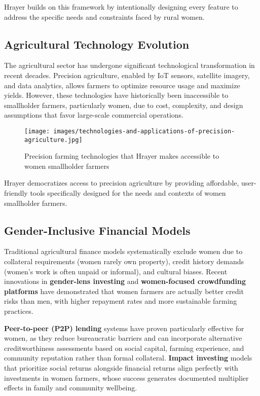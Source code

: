 \documentclass[9pt,twocolumn,twoside]{article}
\begin{document}
Hrayer builds on this framework by intentionally designing every feature to address the specific needs and constraints faced by rural women.

\subsection{Agricultural Technology Evolution}

The agricultural sector has undergone significant technological transformation in recent decades. Precision agriculture, enabled by IoT sensors, satellite imagery, and data analytics, allows farmers to optimize resource usage and maximize yields. However, these technologies have historically been inaccessible to smallholder farmers, particularly women, due to cost, complexity, and design assumptions that favor large-scale commercial operations.

\begin{figure}[H]
\centering
\texttt{[image: images/technologies-and-applications-of-precision-agriculture.jpg]}
\caption{Precision farming technologies that Hrayer makes accessible to women smallholder farmers}
\label{fig:architecture}
\end{figure}

Hrayer democratizes access to precision agriculture by providing affordable, user-friendly tools specifically designed for the needs and contexts of women smallholder farmers.

\subsection{Gender-Inclusive Financial Models}

Traditional agricultural finance models systematically exclude women due to collateral requirements (women rarely own property), credit history demands (women's work is often unpaid or informal), and cultural biases. Recent innovations in \textbf{gender-lens investing} and \textbf{women-focused crowdfunding platforms} have demonstrated that women farmers are actually better credit risks than men, with higher repayment rates and more sustainable farming practices.

\textbf{Peer-to-peer (P2P) lending} systems have proven particularly effective for women, as they reduce bureaucratic barriers and can incorporate alternative creditworthiness assessments based on social capital, farming experience, and community reputation rather than formal collateral. \textbf{Impact investing} models that prioritize social returns alongside financial returns align perfectly with investments in women farmers, whose success generates documented multiplier effects in family and community wellbeing.
\end{document}
